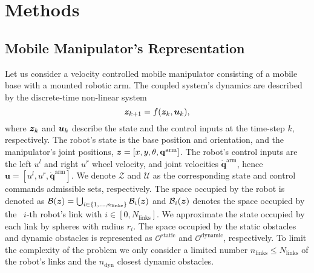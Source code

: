 \section{Methods}%
\label{sec:methods}

\subsection{Mobile Manipulator's Representation}

Let us consider a velocity controlled mobile manipulator consisting of a mobile base with a mounted robotic arm. The coupled system's dynamics are described by the discrete-time non-linear system
\begin{equation}
  \bm{z}_{k+1} = f(\bm{z}_k, \bm{u}_k), 
\end{equation}
where $\bm{z}_k$ and $\bm{u}_k$ describe the state and the control inputs at the time-step $k$, respectively. The robot's state is the base position and orientation, and the manipulator's joint positions, $\bm{z} = [x,y,\theta,\mathbf{q}^{\textrm{arm}}]$. The robot's control inputs are the left $u^l$ and right $u^r$ wheel velocity, and joint velocities $\dot{\mathbf{q}}^{\textrm{arm}}$, hence $\mathbf{u}=[u^l,u^r,\dot{\mathbf{q}}^{\textrm{arm}}]$.  We denote $\mathcal{Z}$ and $\mathcal{U}$ as the corresponding state and control commands admissible sets, respectively.
The space occupied by the robot is denoted as $\mathcal{B}(\bm{z})=\bigcup_{i \in \{1,\dots,n_{\textrm{links}} \}}\mathcal{B}_i(\bm{z})$ and $\mathcal{B}_i(\bm{z})$ denotes the space occupied by the ~{$i$-th} robot's link with $i\in[0,N_{\textrm{links}}]$. We approximate the state occupied by each link by spheres with radius $r_i$. The space occupied by the static obstacles and dynamic obstacles is represented as $\mathcal{O}^{\textrm{static}}$ and $\mathcal{O}^{\textrm{dynamic}}$, respectively. To limit the complexity of the problem we only consider a limited number $n_{\textrm{links}} \le N_{\textrm{links}}$ of the robot's links and the $n_{\textrm{dyn}} $ closest dynamic obstacles.

